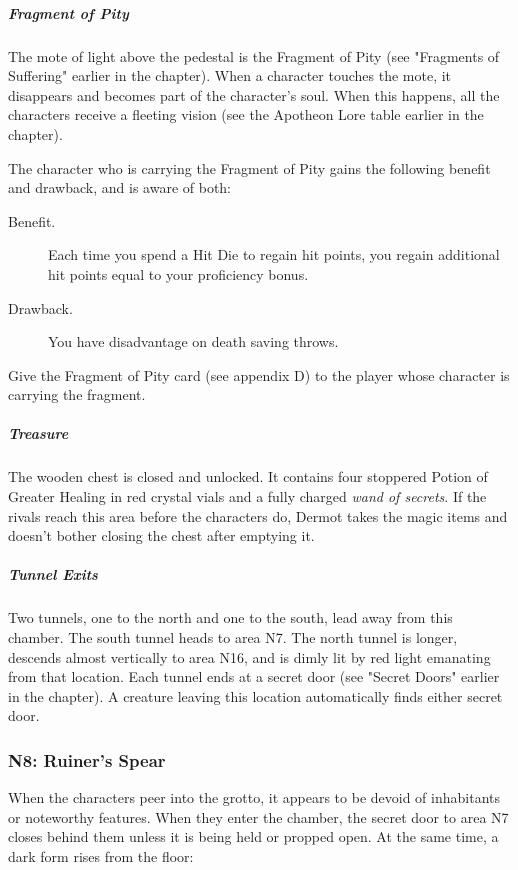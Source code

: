 \documentclass[10pt,a4paper,twoside,fancy,bg=print,twocolumn,openany,nodeprecatedcode]{dndbook}
\begin{document}
\subparagraph{Fragment of Pity}
The mote of light above the pedestal is the Fragment of Pity (see "Fragments of Suffering" earlier in the chapter). When a character touches the mote, it disappears and becomes part of the character's soul. When this happens, all the characters receive a fleeting vision (see the Apotheon Lore table earlier in the chapter).

The character who is carrying the Fragment of Pity gains the following benefit and drawback, and is aware of both:



\begin{description}
\item[Benefit.]
Each time you spend a Hit Die to regain hit points, you regain additional hit points equal to your proficiency bonus.
\item[Drawback.]
You have disadvantage on death saving throws.
\end{description}





Give the Fragment of Pity card (see appendix D) to the player whose character is carrying the fragment.

\subparagraph{Treasure}
The wooden chest is closed and unlocked. It contains four stoppered Potion of Greater Healing in red crystal vials and a fully charged \textit{wand of secrets}. If the rivals reach this area before the characters do, Dermot takes the magic items and doesn't bother closing the chest after emptying it.

\subparagraph{Tunnel Exits}
Two tunnels, one to the north and one to the south, lead away from this chamber. The south tunnel heads to area N7. The north tunnel is longer, descends almost vertically to area N16, and is dimly lit by red light emanating from that location. Each tunnel ends at a secret door (see "Secret Doors" earlier in the chapter). A creature leaving this location automatically finds either secret door.

\subsubsection{N8: Ruiner's Spear}
When the characters peer into the grotto, it appears to be devoid of inhabitants or noteworthy features. When they enter the chamber, the secret door to area N7 closes behind them unless it is being held or propped open. At the same time, a dark form rises from the floor:
\end{document}
